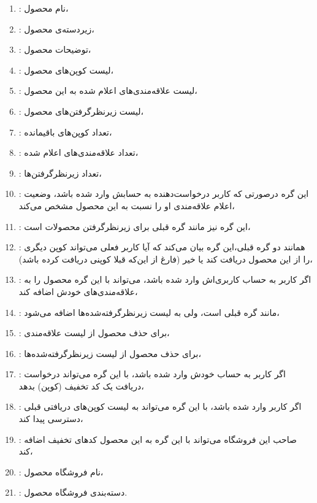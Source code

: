 \begin{enumerate}
\begin{enumerate}
\begin{enumerate}[label=\arabic*.]
			\begin{enumerate}
				\item {}: نام محصول،
				\item {}: زیردسته‌ی محصول،
				\item {}: توضیحات محصول،
				\item {}: لیست کوپن‌های محصول،
				\item {}: لیست علاقه‌مندی‌های اعلام شده به این محصول،
				\item {}: لیست زیرنظرگرفتن‌های محصول،
				\item {}: تعداد کوپن‌های باقیمانده،
				\item {}: تعداد علاقه‌مندی‌های اعلام شده،
				\item {}: تعداد زیرنظرگرفتن‌ها،
				\item {}: این گره درصورتی که کاربر درخواست‌دهنده به حسابش وارد شده باشد، وضعیت اعلام علاقه‌مندی او را نسبت به این محصول مشخص می‌کند،
				\item {}: این گره نیز مانند گره قبلی برای زیرنظرگرفتن محصولات است،
				\item {}: همانند دو گره قبلی،‌این گره بیان می‌کند که آیا کاربر فعلی می‌تواند کوپن دیگری را از این محصول دریافت کند یا خیر (فارغ از این‌که قبلا کوپنی دریافت کرده باشد)،
				\item {}: اگر کاربر به حساب کاربری‌اش وارد شده باشد، می‌تواند با این گره محصول را به علاقه‌مندی‌های خودش اضافه کند،
				\item {}: مانند گره قبلی است، ولی به لیست زیرنظرگرفته‌شده‌ها اضافه می‌شود،
				\item {}: برای حذف محصول از لیست علاقه‌مندی،
				\item {}: برای حذف محصول از لیست زیرنظرگرفته‌شده‌ها،
				\item {}: اگر کاربر به حساب خودش وارد شده باشد، با این گره می‌تواند درخواست دریافت یک کد تخفیف (کوپن) بدهد،
				\item {}: اگر کاربر وارد شده باشد، با این گره می‌تواند به لیست کوپن‌های دریافتی قبلی دسترسی پیدا کند،
				\item {}: صاحب این فروشگاه می‌تواند با این گره به این محصول کدهای تخفیف اضافه کند،
				\item {}: نام فروشگاه محصول،
				\item {}: دسته‌بندی فروشگاه محصول.	
				
			\end{enumerate}
		\end{enumerate}
	\end{enumerate}
\end{enumerate}


